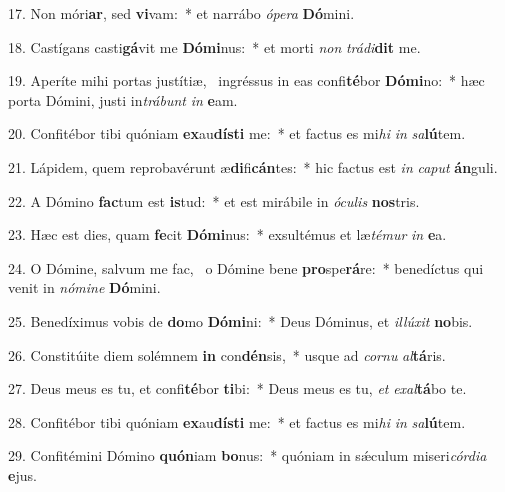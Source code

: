 17. Non móri\textbf{ar}, sed \textbf{vi}vam:~*  et narrábo \textit{ó}\textit{pe}\textit{ra} \textbf{Dó}mini.\

18. Castígans casti\textbf{gá}vit me \textbf{Dó}\textbf{mi}nus:~*  et morti \textit{non} \textit{trá}\textit{di}\textbf{dit} me.\

19. Aperíte mihi portas justítiæ, \dag\  ingréssus in eas confi\textbf{té}bor \textbf{Dó}\textbf{mi}no:~*  hæc porta Dómini, justi in\textit{trá}\textit{bunt} \textit{in} \textbf{e}am.\

20. Confitébor tibi quóniam \textbf{ex}au\textbf{dís}\textbf{ti} me:~*  et factus es mi\textit{hi} \textit{in} \textit{sa}\textbf{lú}tem.\

21. Lápidem, quem reprobavérunt æ\textbf{di}fi\textbf{cán}tes:~*  hic factus est \textit{in} \textit{ca}\textit{put} \textbf{án}guli.\

22. A Dómino \textbf{fac}tum est \textbf{is}tud:~*  et est mirábile in \textit{ó}\textit{cu}\textit{lis} \textbf{nos}tris.\

23. Hæc est dies, quam \textbf{fe}cit \textbf{Dó}\textbf{mi}nus:~*  exsultémus et læ\textit{té}\textit{mur} \textit{in} \textbf{e}a.\

24. O Dómine, salvum me fac, \dag\  o Dómine bene \textbf{pro}spe\textbf{rá}re:~*  benedíctus qui venit in \textit{nó}\textit{mi}\textit{ne} \textbf{Dó}mini.\

25. Benedíximus vobis de \textbf{do}mo \textbf{Dó}\textbf{mi}ni:~*  Deus Dóminus, et \textit{il}\textit{lú}\textit{xit} \textbf{no}bis.\

26. Constitúite diem solémnem \textbf{in} con\textbf{dén}sis,~*  usque ad \textit{cor}\textit{nu} \textit{al}\textbf{tá}ris.\

27. Deus meus es tu, et confi\textbf{té}bor \textbf{ti}bi:~*  Deus meus es tu, \textit{et} \textit{ex}\textit{al}\textbf{tá}bo te.\

28. Confitébor tibi quóniam \textbf{ex}au\textbf{dís}\textbf{ti} me:~*  et factus es mi\textit{hi} \textit{in} \textit{sa}\textbf{lú}tem.\

29. Confitémini Dómino \textbf{quón}iam \textbf{bo}nus:~*  quóniam in sǽculum miseri\textit{cór}\textit{di}\textit{a} \textbf{e}jus.\

